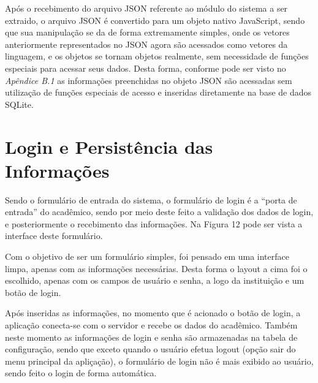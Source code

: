 Após o recebimento do arquivo JSON referente ao módulo do sistema a ser extraido, o arquivo JSON é convertido para um objeto nativo JavaScript, sendo que sua manipulação se da de forma extremamente simples, onde os vetores anteriormente representados no JSON agora são acessados como vetores da linguagem, e os objetos se tornam objetos realmente, sem necessidade de funções especiais para acessar seus dados. Desta forma, conforme pode ser visto no \emph{Apêndice B.1} as informações preenchidas no objeto JSON são acessadas sem utilização de funções especiais de acesso e inseridas diretamente na base de dados SQLite.

\section{Login e Persistência das Informações}
Sendo o formulário de entrada do sistema, o formulário de login é a ``porta de entrada'' do acadêmico, sendo por meio deste feito a validação dos dados de login, e posteriormente o recebimento das informações. Na Figura 12 pode ser vista a interface deste formulário.

Com o objetivo de ser um formulário simples, foi pensado em uma interface limpa, apenas com as informações necessárias. Desta forma o layout a cima foi o escolhido, apenas com os campos de usuário e senha, a logo da instituição e um botão de login.

Após inseridas as informações, no momento que é acionado o botão de login, a aplicação conecta-se com o servidor e recebe os dados do acadêmico. Também neste momento as informações de login e senha são armazenadas na tabela de configuração, sendo que exceto quando o usuário efetua logout (opção sair do menu principal da apliçação), o formulário de login não é mais exibido ao usuário, sendo feito o login de forma automática.

